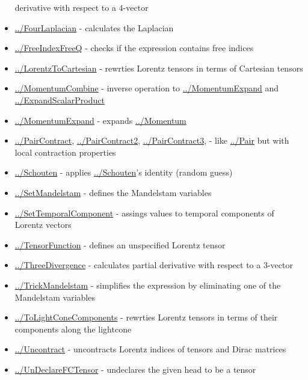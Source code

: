 \documentclass[../FeynCalcManual.tex]{subfiles}
\begin{document}
\begin{itemize}
  derivative with respect to a \(4\)-vector
\item
  \hyperlink{../fourlaplacian}{../FourLaplacian} - calculates the
  Laplacian
\item
  \hyperlink{../freeindexfreeq}{../FreeIndexFreeQ} - checks if the
  expression contains free indices
\item
  \hyperlink{../lorentztocartesian}{../LorentzToCartesian} - rewrties
  Lorentz tensors in terms of Cartesian tensors
\item
  \hyperlink{../momentumcombine}{../MomentumCombine} - inverse operation
  to \hyperlink{../momentumexpand}{../MomentumExpand} and
  \hyperlink{../expandscalarproduct}{../ExpandScalarProduct}
\item
  \hyperlink{../momentumexpand}{../MomentumExpand} - expands
  \hyperlink{../momentum}{../Momentum}
\item
  \hyperlink{../paircontract}{../PairContract},
  \hyperlink{../paircontract2}{../PairContract2},
  \hyperlink{../paircontract3}{../PairContract3}, - like
  \hyperlink{../pair}{../Pair} but with local contraction properties
\item
  \hyperlink{../schouten}{../Schouten} - applies
  \hyperlink{../schouten}{../Schouten}'s identity (random guess)
\item
  \hyperlink{../setmandelstam}{../SetMandelstam} - defines the
  Mandelstam variables
\item
  \hyperlink{../settemporalcomponent}{../SetTemporalComponent} - assings
  values to temporal components of Lorentz vectors
\item
  \hyperlink{../tensorfunction}{../TensorFunction} - defines an
  unspecified Lorentz tensor
\item
  \hyperlink{../threedivergence}{../ThreeDivergence} - calculates
  partial derivative with respect to a \(3\)-vector
\item
  \hyperlink{../trickmandelstam}{../TrickMandelstam} - simplifies the
  expression by eliminating one of the Mandelstam variables
\item
  \hyperlink{../tolightconecomponents}{../ToLightConeComponents} -
  rewrties Lorentz tensors in terms of their components along the
  lightcone
\item
  \hyperlink{../uncontract}{../Uncontract} - uncontracts Lorentz indices
  of tensors and Dirac matrices
\item
  \hyperlink{../undeclarefctensor}{../UnDeclareFCTensor} - undeclares
  the given head to be a tensor
\end{itemize}
\end{document}
